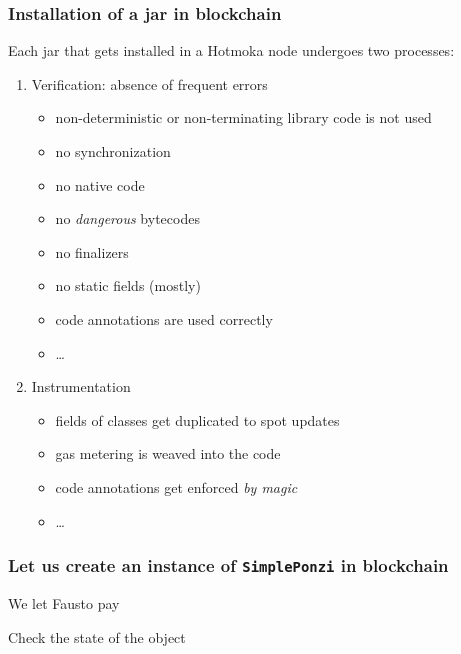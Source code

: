 \documentclass[11pt]{beamer}  %
\def\codesize{\smaller}
\def\<#1>{\codeid{#1}}
\newcommand{\codeid}[1]{\ifmmode{\mbox{\codesize\ttfamily{#1}}}\else{\codesize\ttfamily #1}\fi}
\begin{document}
\begin{frame}\frametitle{Installation of a jar in blockchain}

  Each jar that gets installed in a Hotmoka node undergoes two processes:

  \begin{enumerate}
  \item Verification: absence of frequent errors
    \begin{itemize}
    \item non-deterministic or non-terminating library code is not used
    \item no synchronization
    \item no native code
    \item no \emph{dangerous} bytecodes
    \item no finalizers
    \item no static fields (mostly)
    \item code annotations are used correctly
    \item \ldots
    \end{itemize}
  \item Instrumentation
    \begin{itemize}
    \item fields of \<Storage> classes get duplicated to spot updates
    \item gas metering is weaved into the code
    \item code annotations get enforced \emph{by magic}
    \item \ldots
    \end{itemize}
  \end{enumerate}

\end{frame}

\begin{frame}[fragile]\frametitle{Let us create an instance of \texttt{SimplePonzi} in blockchain}

  \begin{greenbox}{We let Fausto pay}
{\small{}}
  \end{greenbox}

  \pause
  \bigskip
  \begin{greenbox}{Check the state of the object}
{\small{}}
  \end{greenbox}

\end{frame}
\end{document}
